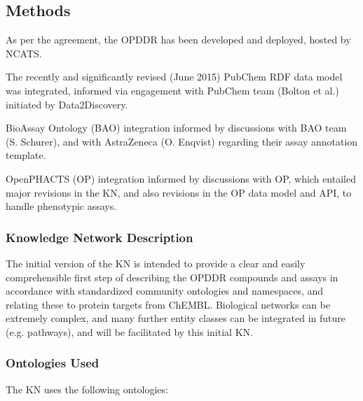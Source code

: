 \subsection{Methods}

As per the agreement, the OPDDR has been developed and deployed, hosted by NCATS. 

The recently and significantly revised (June 2015) PubChem RDF data model was integrated, informed via engagement with PubChem team (Bolton et al.) initiated by Data2Discovery.

BioAssay Ontology (BAO) integration informed by discussions with BAO team (S. Schurer), and with AstraZeneca (O. Enqvist) regarding their assay annotation template. 

OpenPHACTS (OP) integration informed by discussions with OP, which entailed major revisions in the KN, and also revisions in the OP data model and API, to handle phenotypic assays. 

\subsubsection{Knowledge Network Description}

The initial version of the KN is intended to provide a clear and easily comprehensible first step of describing the OPDDR compounds and assays in accordance with standardized community ontologies and namespaces, and relating these to protein targets from ChEMBL.  Biological networks can be extremely complex, and many further entity classes can be integrated in future (e.g. pathways), and will be facilitated by this initial KN.

\subsubsection{Ontologies Used}

The KN uses the following ontologies:

